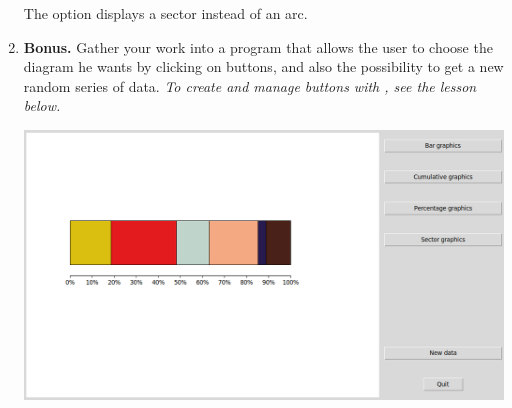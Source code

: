 \documentclass[11pt,class=report,crop=false]{standalone}
\begin{document}
\begin{activite}[Graphics]
\begin{enumerate}
The option  displays a sector instead of an arc. 


  \item \textbf{Bonus.} Gather your work into a program that allows the user to choose the diagram he wants by clicking on buttons, and also the possibility to get a new random series of data. \emph{To create and manage buttons with , see the lesson below.}
  
\begin{center}
\includegraphics[scale=\myscale,scale=0.3]{screen-stat-2e-en}
\end{center} 
  
  \end{enumerate}
\end{activite}


\end{document}
